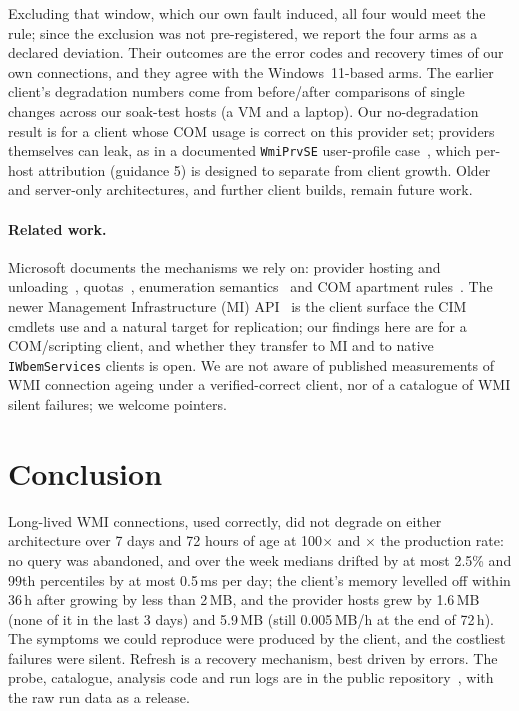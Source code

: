 \documentclass[letterpaper,twocolumn,10pt]{article}
\newcommand{\code}[1]{\texttt{\small #1}}
\begin{document}
Excluding that window, which our own fault induced, all four would meet the rule; since the exclusion was not pre-registered, we report the four arms as a declared deviation.
Their outcomes are the error codes and recovery times of our own connections, and they agree with the Windows~11-based arms.
The earlier client's degradation numbers come from before/after comparisons of single changes across our soak-test hosts (a VM and a laptop).
Our no-degradation result is for a client whose COM usage is correct on this provider set; providers themselves can leak, as in a documented \code{WmiPrvSE} user-profile case~\cite{ms-kb2832248}, which per-host attribution (guidance 5) is designed to separate from client growth.
Older and server-only architectures, and further client builds, remain future work.

\paragraph{Related work.}
Microsoft documents the mechanisms we rely on: provider hosting and unloading~\cite{ms-hosting,ms-unload}, quotas~\cite{ms-quota}, enumeration semantics~\cite{ms-next} and COM apartment rules~\cite{ms-sta}.
The newer Management Infrastructure (MI) API~\cite{ms-mi} is the client surface the CIM cmdlets use and a natural target for replication; our findings here are for a COM/scripting client, and whether they transfer to MI and to native \code{IWbemServices} clients is open.
We are not aware of published measurements of WMI connection ageing under a verified-correct client, nor of a catalogue of WMI silent failures; we welcome pointers.

\section{Conclusion}
Long-lived WMI connections, used correctly, did not degrade on either architecture over 7 days and 72 hours of age at 100$\times$ and \WbK{}$\times$ the production rate: no query was abandoned, and over the week medians drifted by at most 2.5\% and 99th percentiles by at most 0.5\,ms per day; the client's memory levelled off within 36\,h after growing by less than 2\,MB, and the provider hosts grew by 1.6\,MB (none of it in the last 3 days) and 5.9\,MB (still 0.005\,MB/h at the end of 72\,h).
The symptoms we could reproduce were produced by the client, and the costliest failures were silent.
Refresh is a recovery mechanism, best driven by errors.
The probe, catalogue, analysis code and run logs are in the public repository~\cite{repo}, with the raw run data as a release.
\end{document}
